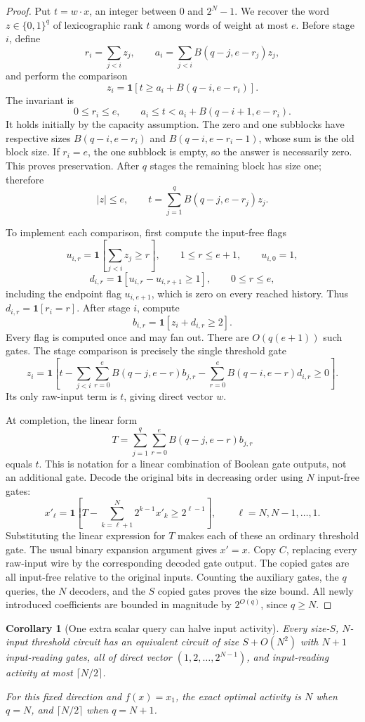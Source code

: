 \documentclass[11pt]{article}
\newtheorem{corollary}[theorem]{Corollary}
\theoremstyle{definition}
\newcommand{\bits}{\{0,1\}}
\newcommand{\ind}[1]{\mathbf 1[#1]}
\begin{document}
\begin{proof}
Put \(t=w\cdot x\), an integer between \(0\) and \(2^N-1\). We recover the word \(z\in\bits^q\) of lexicographic rank \(t\) among words of weight at most \(e\). Before stage \(i\), define
\[
 r_i=\sum_{j<i}z_j,
 \qquad
 a_i=\sum_{j<i}B(q-j,e-r_j)z_j,
\]
and perform the comparison
\[
 z_i=\ind{t\ge a_i+B(q-i,e-r_i)}.
\]
The invariant is
\[
 0\le r_i\le e,
 \qquad
 a_i\le t<a_i+B(q-i+1,e-r_i).
\]
It holds initially by the capacity assumption. The zero and one subblocks have respective sizes \(B(q-i,e-r_i)\) and \(B(q-i,e-r_i-1)\), whose sum is the old block size. If \(r_i=e\), the one subblock is empty, so the answer is necessarily zero. This proves preservation. After \(q\) stages the remaining block has size one; therefore
\[
 |z|\le e,
 \qquad t=\sum_{j=1}^q B(q-j,e-r_j)z_j.
\]

To implement each comparison, first compute the input-free flags
\[
 u_{i,r}=\ind{\sum_{j<i}z_j\ge r},
 \qquad 1\le r\le e+1,
 \qquad u_{i,0}=1,
\]
\[
 d_{i,r}=\ind{u_{i,r}-u_{i,r+1}\ge1},
 \qquad 0\le r\le e,
\]
including the endpoint flag \(u_{i,e+1}\), which is zero on every reached history. Thus \(d_{i,r}=\ind{r_i=r}\). After stage \(i\), compute
\[
 b_{i,r}=\ind{z_i+d_{i,r}\ge2}.
\]
Every flag is computed once and may fan out. There are \(O(q(e+1))\) such gates. The stage comparison is precisely the single threshold gate
\[
 z_i=\ind{
 t-\sum_{j<i}\sum_{r=0}^e B(q-j,e-r)b_{j,r}
   -\sum_{r=0}^e B(q-i,e-r)d_{i,r}\ge0}.
\]
Its only raw-input term is \(t\), giving direct vector \(w\).

At completion, the linear form
\[
 T=\sum_{j=1}^q\sum_{r=0}^e B(q-j,e-r)b_{j,r}
\]
equals \(t\). This is notation for a linear combination of Boolean gate outputs, not an additional gate. Decode the original bits in decreasing order using \(N\) input-free gates:
\[
 x'_\ell=\ind{
 T-\sum_{k=\ell+1}^N2^{k-1}x'_k\ge2^{\ell-1}},
 \qquad \ell=N,N-1,\ldots,1.
\]
Substituting the linear expression for \(T\) makes each of these an ordinary threshold gate. The usual binary expansion argument gives \(x'=x\). Copy \(C\), replacing every raw-input wire by the corresponding decoded gate output. The copied gates are all input-free relative to the original inputs. Counting the auxiliary gates, the \(q\) queries, the \(N\) decoders, and the \(S\) copied gates proves the size bound. All newly introduced coefficients are bounded in magnitude by \(2^{O(q)}\), since \(q\ge N\).
\end{proof}

\begin{corollary}[One extra scalar query can halve input activity]\label{cor:scalar_extra_query}
Every size-\(S\), \(N\)-input threshold circuit has an equivalent circuit of size \(S+O(N^2)\) with \(N+1\) input-reading gates, all of direct vector \((1,2,\ldots,2^{N-1})\), and input-reading activity at most \(\lceil N/2\rceil\).

For this fixed direction and \(f(x)=x_1\), the exact optimal activity is \(N\) when \(q=N\), and \(\lceil N/2\rceil\) when \(q=N+1\).
\end{corollary}
\end{document}
